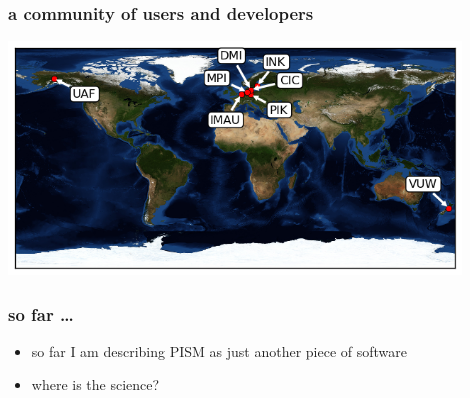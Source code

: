 \documentclass[hide notes,intlimits]{beamer}
\begin{document}
\begin{frame}
  \frametitle{a community of users and developers}
 \begin{center}
    \includegraphics[width=120mm]{pism-users-map.png}
  \end{center}
\end{frame}


\begin{frame}
  \frametitle{so far \dots}

  \begin{itemize}
  \item so far I am describing PISM as just another piece of software
  \item where is the science?
  \end{itemize}
\end{frame}
\end{document}
